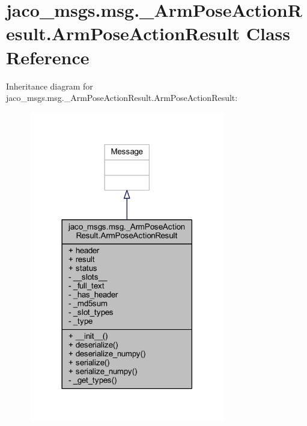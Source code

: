 \hypertarget{classjaco__msgs_1_1msg_1_1__ArmPoseActionResult_1_1ArmPoseActionResult}{}\section{jaco\+\_\+msgs.\+msg.\+\_\+\+Arm\+Pose\+Action\+Result.\+Arm\+Pose\+Action\+Result Class Reference}
\label{classjaco__msgs_1_1msg_1_1__ArmPoseActionResult_1_1ArmPoseActionResult}


Inheritance diagram for jaco\+\_\+msgs.\+msg.\+\_\+\+Arm\+Pose\+Action\+Result.\+Arm\+Pose\+Action\+Result\+:
\nopagebreak
\begin{figure}[H]
\begin{center}
\leavevmode
\includegraphics[width=242pt]{d0/ddd/classjaco__msgs_1_1msg_1_1__ArmPoseActionResult_1_1ArmPoseActionResult__inherit__graph}
\end{center}
\end{figure}


